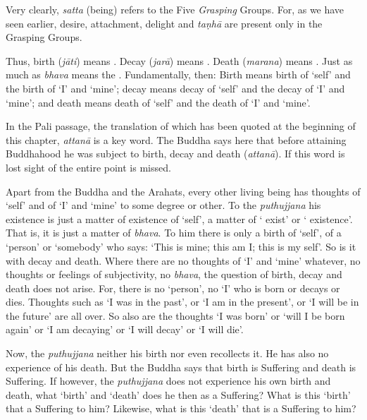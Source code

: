 Very clearly, \emph{satta} (being) refers to the Five \emph{Grasping} Groups. For, as we have seen earlier, desire, attachment, delight and \emph{taṇhā} are present only in the Grasping Groups.

Thus, birth (\emph{jāti}) means . Decay (\emph{jarā}) means . Death (\emph{marana}) means . Just as much as \emph{bhava} means the . Fundamentally, then: Birth means birth of `self' and the birth of `I' and `mine'; decay means decay of `self' and the decay of `I' and `mine'; and death means death of `self' and the death of `I' and `mine'.

In the Pali passage, the translation of which has been quoted at the beginning of this chapter, \emph{attanā} is a key word. The Buddha says here that before attaining Buddhahood he was subject to birth, decay and death  (\emph{attanā}). If this word is lost sight of the entire point is missed.

Apart from the Buddha and the Arahats, every other living being has thoughts of `self' and of `I' and `mine' to some degree or other. To the \emph{puthujjana} his existence is just a matter of existence of `self', a matter of ` exist' or ` existence'. That is, it is just a matter of \emph{bhava}. To him there is only a birth of `self', of a `person' or `somebody' who says: `This is mine; this am I; this is my self'. So is it with decay and death. Where there are no thoughts of `I' and `mine' whatever, no thoughts or feelings of subjectivity, no \emph{bhava}, the question of birth, decay and death does not arise. For, there is no `person', no `I' who is born or decays or dies. Thoughts such as `I was in the past', or `I am in the present', or `I will be in the future' are all over. So also are the thoughts `I was born' or `will I be born again' or `I am decaying' or `I will decay' or `I will die'.

Now, the \emph{puthujjana} neither  his birth nor even recollects it. He has also no experience of his death. But the Buddha says that birth is Suffering and death is Suffering. If however, the \emph{puthujjana} does not experience his own birth and death, what `birth' and `death' does he then  as a Suffering? What is this `birth' that  a Suffering to him? Likewise, what is this `death' that is a Suffering to him?

